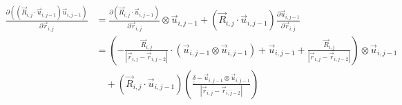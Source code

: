 \documentclass{article}
\renewcommand{\ij}{_{i,j}}
\newcommand{\ijj}{_{i,j-1}}
\newcommand{\ijk}{_{i,j-2}}
\newcommand{\ijjj}{_{i,j-2}}
\newcommand{\magn}[1]{\left\vert #1 \right\vert }
\renewcommand{\part}[2]{\frac{\partial #1 }{\partial #2}}
\newcommand{\ten}[1]{\underline{\underline{#1}}}
\newcommand{\rij}{\vec{r} \ij}
\newcommand{\Rij}{\vec{R} \ij}
\newcommand{\rijjj}{\vec{r} \ijjj}
\newcommand{\uijj}{\vec{u} \ijj}
\begin{document}
\begin{align*}
  \part{\left(\left(\vec{R}\ij \cdot \vec{u} \ijj \right) 
  \vec{u} \ijj \right)
  }{\vec{r}\ij} 
  &= 
  \part{\left(\vec{R}\ij \cdot \vec{u} \ijj \right)}{\vec{r}\ij}  
  \otimes
  \vec{u} \ijj  + 
  \left(\vec{R}\ij \cdot \vec{u} \ijj \right)
  \part{\vec{u} \ijj }{\vec{r}\ij}
   \\
  &= 
  \left(
  -\frac{\vec{R} \ij}{\magn{\rij - \rijjj}} \cdot (\uijj \otimes \uijj ) 
  +  \uijj
  +  \frac{\Rij}{\magn{\rij - \rijjj}}
  \right) 
  \otimes \uijj
  \\
  &
   \quad 
  +  
  \left(\vec{R}\ij \cdot \vec{u} \ijj \right)
  \left(
  {
  \frac{\ten{\delta} - \uijj \otimes \uijj}{\magn{\rij - \rijjj}}
  }
  \right)
\end{align*}
\end{document}
